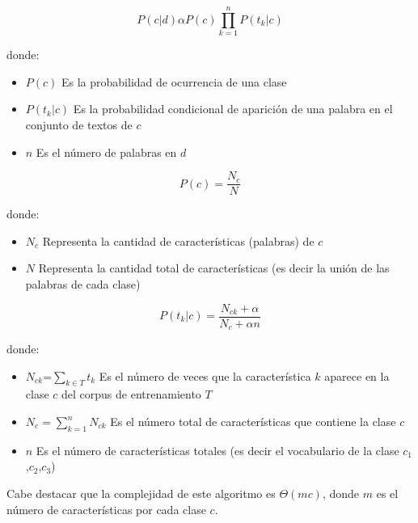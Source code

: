\begin{equation}
P(c|d) \alpha P(c)\prod_{k=1}^{n}P(t_k|c)
\end{equation}

donde:

\begin{itemize}
	\item $P(c)$ Es la probabilidad de ocurrencia de una clase
	\item $P(t_k|c)$ Es la probabilidad condicional de aparición de una palabra en el conjunto de textos de $c$
	\item $n$ Es el número de palabras en $d$
\end{itemize}



\begin{equation}
P(c)=\frac{N_c}{N}
\end{equation}

donde:
\begin{itemize}
	\item $N_c$ Representa la cantidad de características (palabras) de $c$
	\item $N$ Representa la cantidad total de características (es decir la unión de las palabras de cada clase)
\end{itemize}

\begin{equation}
P(t_k|c)=\frac{N_{ck}+\alpha}{N_c+\alpha n}
\label{eq:cp3:naiveBayes}
\end{equation}

donde:
\begin{itemize}
	\item $N_{ck}$=$\sum\nolimits_{k\in T}t_k$ Es el número de veces que la característica $k$ aparece en la clase $c$ del corpus de entrenamiento $T$
	\item $N_c=\sum\nolimits_{k=1}^{n}N_{ck}$ Es el número total de características que contiene la clase $c$
	\item $n$ Es el número de características totales (es decir el vocabulario de la clase $c_1$,$c_2$,$c_3$)
\end{itemize}


Cabe destacar que la complejidad de este algoritmo es $\Theta(mc)$, donde $m$ es el número de características por cada clase $c$.

